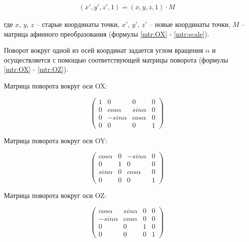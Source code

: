 \begin{equation}
	\label{mtr:affineTransform}
	\begin{gathered}
		(x', y', z', 1) = (x, y, z, 1) \cdot M
	\end{gathered}
\end{equation}

где $x$, $y$, $z$ -- старые координаты точки, $x'$, $y'$, $z'$ -- новые координаты точки, $M$ -- матрица афинного преобразования (формулы \ref{mtr:OX} - \ref{mtr:scale}).

Поворот вокруг одной из осей координат задается углом вращения $\alpha$ и осуществляется с помощью соответствующей матрицы поворота (формулы \ref{mtr:OX} - \ref{mtr:OZ}).

Матрица поворота вокруг оси OX:

\begin{equation}
	\label{mtr:OX}
	\begin{pmatrix}
		1 	& 0 		  & 0 	       & 0 \\
		0 	& cos \alpha  & sin \alpha & 0 \\
		0	& -sin \alpha & cos \alpha & 0 \\
		0 	& 0 		  & 0          & 1
	\end{pmatrix}
\end{equation}

Матрица поворота вокруг оси OY:

\begin{equation}
	\label{mtr:OY}
	\begin{pmatrix}
		cos \alpha 	& 0 & -sin \alpha & 0 \\
		0 			& 1 & 0 		  & 0 \\
		sin \alpha	& 0 & cos \alpha  & 0 \\
		0 			& 0 & 0           & 1
	\end{pmatrix}
\end{equation}

Матрица поворота вокруг оси OZ:

\begin{equation}
	\label{mtr:OZ}
	\begin{pmatrix}
		cos \alpha 	 & sin \alpha & 0 & 0 \\
		-sin \alpha  & cos \alpha & 0 & 0 \\
		0	 		 & 0		  & 1 & 0 \\
		0 			 & 0 		  & 0 & 1
	\end{pmatrix}
\end{equation}

\clearpage

